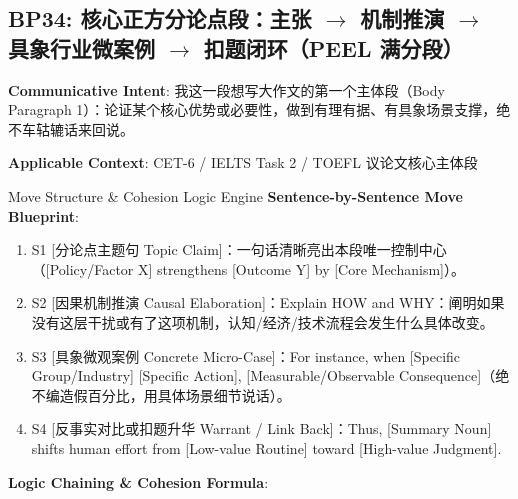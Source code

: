 \subsection{BP34: 核心正方分论点段：主张 $\to$ 机制推演 $\to$ 具象行业微案例 $\to$ 扣题闭环（PEEL 满分段）}\label{sec:bp:BP34}
\noindent\textbf{\color{AcadNavy}Communicative Intent}: 我这一段想写大作文的第一个主体段（Body Paragraph 1）：论证某个核心优势或必要性，做到有理有据、有具象场景支撑，绝不车轱辘话来回说。\par\vspace{2pt}
\noindent\textbf{\color{AcadSlate}Applicable Context}: CET-6 / IELTS Task 2 / TOEFL 议论文核心主体段\par\vspace{4pt}
\begin{ConceptBox}{Move Structure \& Cohesion Logic Engine}
\textbf{Sentence-by-Sentence Move Blueprint}:
\begin{enumerate}[label=\textbf{\color{AcadNavy}S\arabic*.}, leftmargin=2em, itemsep=2pt]
  \item S1 [分论点主题句 Topic Claim]：一句话清晰亮出本段唯一控制中心（[Policy/Factor X] strengthens [Outcome Y] by [Core Mechanism]）。
  \item S2 [因果机制推演 Causal Elaboration]：Explain HOW and WHY：阐明如果没有这层干扰或有了这项机制，认知/经济/技术流程会发生什么具体改变。
  \item S3 [具象微观案例 Concrete Micro-Case]：For instance, when [Specific Group/Industry] [Specific Action], [Measurable/Observable Consequence]（绝不编造假百分比，用具体场景细节说话）。
  \item S4 [反事实对比或扣题升华 Warrant / Link Back]：Thus, [Summary Noun] shifts human effort from [Low-value Routine] toward [High-value Judgment].
\end{enumerate}\par\vspace{4pt}
\textbf{Logic Chaining \& Cohesion Formula}:\par{}
\end{ConceptBox}
